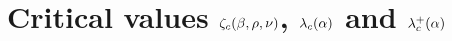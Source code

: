 \documentclass[12pt,a4paper,reqno]{amsart}
\newcommand{\bbE}{{\ensuremath{\mathbb E}} }
\newcommand{\bbP}{{\ensuremath{\mathbb P}} }
\newcommand{\bbQ}{{\ensuremath{\mathbb Q}} }
\let\a=\alpha \let\b=\beta   \let\d=\delta  \let\e=\varepsilon
\let\r=\rho  \let\s=\sigma \let\t=\tau   \let\th=\vartheta
\let\O=\Omega \let\P=\Pi   \let\Ps=\Psi \let\Si=\Sigma \let\X=\Xi
\newcommand{\be}{\begin{equation}}
\newcommand{\en}{\end{equation}}
\begin{document}
%
%
\section{Critical values $\z_c (\b,\r,\nu)$, $\l_c(\a)$ and  $\l^+_c(\a)$}\label{guizzo}
%
\end{document}
